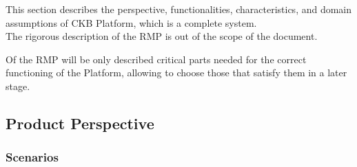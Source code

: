 This section describes the perspective, functionalities, characteristics, and domain assumptions of CKB Platform, which is a complete system.\\
The rigorous description of the RMP is out of the scope of the document. 

Of the RMP will be only described critical parts needed for the correct functioning of the Platform, allowing to choose those that satisfy them in a later stage.\\

\subsection{Product Perspective}
\subsubsection{Scenarios}
